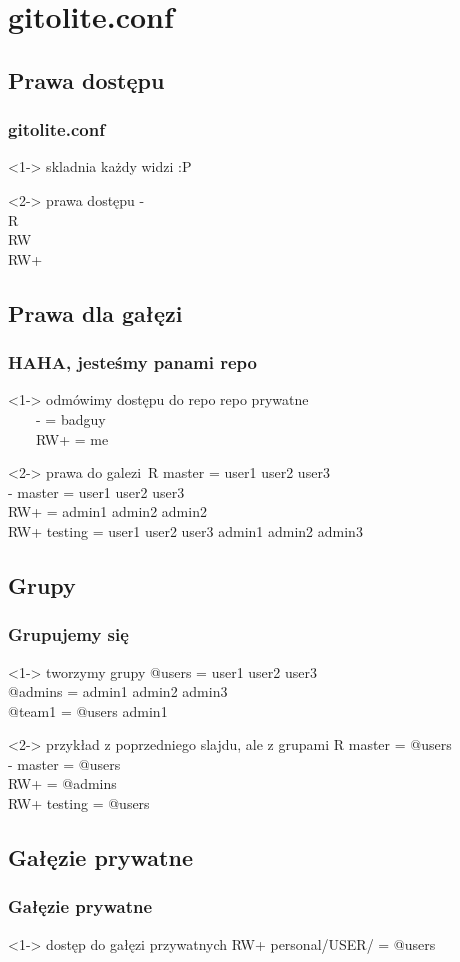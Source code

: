 \documentclass[10pt]{beamer}
\begin{document}
\section{gitolite.conf}
\subsection{Prawa dostępu}
\begin{frame}
	\frametitle{gitolite.conf}
	\begin{block}<1->
	{skladnia}
	każdy widzi :P
	\end{block}
	\begin{block}<2->
	{prawa dostępu}
	-\\
	R\\
	RW\\
	RW+
	\end{block}
\end{frame}
\subsection{Prawa dla gałęzi}
\begin{frame}
	\frametitle{HAHA, jesteśmy panami repo}
	\begin{block}<1->
	{odmówimy dostępu do repo}
	repo prywatne\\
	\ \ \ \ - = badguy\\
	\ \ \ \ RW+ = me
	\end{block}
	\begin{block}<2->
	{prawa do galezi}\
	R master = user1 user2 user3\\
	- master = user1 user2 user3\\
	RW+ = admin1 admin2 admin2\\
	RW+ testing = user1 user2 user3 admin1 admin2 admin3
	\end{block}
\end{frame}
\subsection{Grupy}
\begin{frame}
	\frametitle{Grupujemy się}	
	\begin{block}<1->
	{tworzymy grupy}
	@users = user1 user2 user3\\
	@admins = admin1 admin2 admin3\\
	@team1 = @users admin1
	\end{block}
	\begin{block}<2->
	{przykład z poprzedniego slajdu, ale z grupami}
	R master = @users\\
	- master = @users\\
	RW+ = @admins\\
	RW+ testing = @users
	\end{block}
\end{frame}
\subsection{Gałęzie prywatne}
\begin{frame}
	\frametitle{Gałęzie prywatne}
	\begin{block}<1->
	{dostęp do gałęzi przywatnych}
	RW+ personal/USER/ = @users
	\end{block}
\end{frame}
\end{document}
